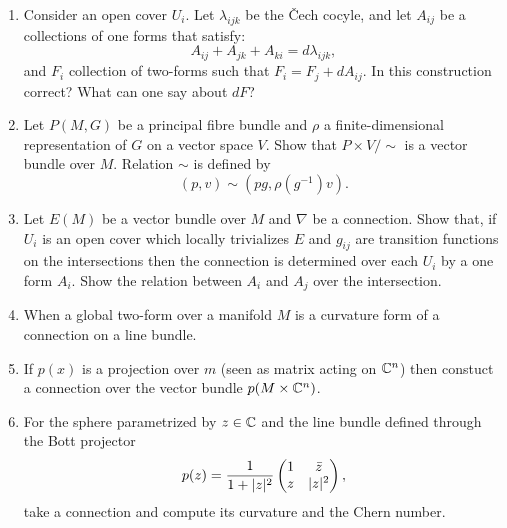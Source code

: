 \documentclass[a4paper,11pt]{article}
\begin{document}
\begin{enumerate}
\item Consider an open cover $U_{ i }$. Let $\lambda_{ i j k }$ be the
  \v{C}ech cocyle, and let $A_{ i j }$ be a collections of one forms
  that satisfy:
  \begin{equation}
    \label{eq:8}
    A_{ i j } + A_{ j k } + A_{ k i } = d\lambda_{ i j k },
  \end{equation}
  and $F_{ i }$ collection of two-forms such that
  $F_{ i } = F_{ j } + dA_{ i j }$. In this construction correct? What
  can one say about $dF$?

\item Let $P( M, G )$ be a principal fibre bundle and $\rho$ a
  finite-dimensional representation of $G$ on a vector space $V$. Show
  that $P \times V / \sim$ is a vector bundle over $M$. Relation
  $\sim$ is defined by
  \begin{equation}
    \label{eq:9}
    ( p, v ) \sim \left( pg, \rho\left( g^{ -1 } \right) v \right).
  \end{equation}

\item Let $E( M )$ be a vector bundle over $M$ and $\nabla$ be a
  connection. Show that, if $U_{ i }$ is an open cover which locally
  trivializes $E$ and $g_{ i j }$ are transition functions on the
  intersections then the connection is determined over each $U_{ i }$
  by a one form $A_{ i }$. Show the relation between $A_{ i }$ and
  $A_{ j }$ over the intersection.

\item When a global two-form over a manifold $M$ is a curvature form
  of a connection on a line bundle.

\item If $p( x )$ is a projection over $m$ (seen as matrix acting on
  $\mathbb{C}^{ n }$) then constuct a connection over the vector bundle
  $p( M \times \mathbb{C}^{ n } )$.

\item For the sphere parametrized by $z \in \mathbb{C}$ and the line bundle
  defined through the Bott projector
  \begin{equation}
    \label{eq:10}
    p( z ) =
    \frac{ 1 }{ 1 + \lvert{  z  }\rvert^{ 2 } }
    \begin{pmatrix}
      1 & \bar{z} \\
      z & \lvert{  z  }\rvert^{ 2 }
    \end{pmatrix},
  \end{equation}
  take a connection and compute its curvature and the Chern number.


\end{enumerate}
\end{document}
